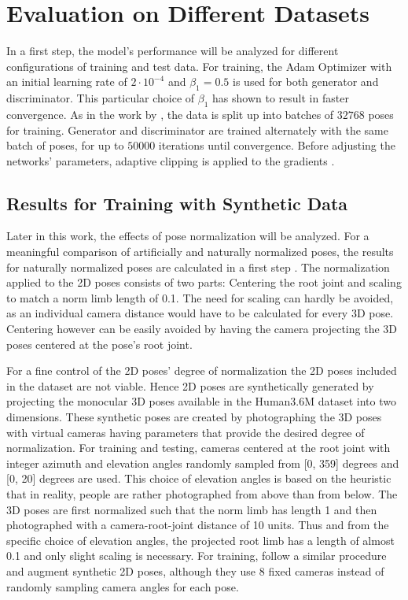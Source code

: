 \section{
	Evaluation on Different Datasets}
\label{sec:evaluation}

In a first step, the model's performance will be analyzed for different configurations of training and test data.
For training, the Adam Optimizer \cite{kingma17} with an initial learning rate of $2 \cdot 10^{-4}$ and $\beta_1 = 0.5$ is used for both generator and discriminator.
This particular choice of $\beta_1$ has shown to result in faster convergence.
As in the work by \citet{drover18}, the data is split up into batches of $32768$ poses for training.
Generator and discriminator are trained alternately with the same batch of poses, for up to $50000$ iterations until convergence.
Before adjusting the networks' parameters, adaptive clipping is applied to the gradients \cite[Section~3.2.1]{chorowski14}.


\subsection{Results for Training with Synthetic Data}

Later in this work, the effects of pose normalization will be analyzed.
For a meaningful comparison of artificially and naturally normalized poses, the results for naturally normalized poses are calculated in a first step .
The normalization applied to the 2D poses consists of two parts: Centering the root joint and scaling to match a norm limb length of 0.1.
The need for scaling can hardly be avoided, as an individual camera distance would have to be calculated for every 3D pose.
Centering however can be easily avoided by having the camera projecting the 3D poses centered at the pose's root joint.

For a fine control of the 2D poses' degree of normalization the 2D poses included in the dataset are not viable.
Hence 2D poses are synthetically generated by projecting the monocular 3D poses available in the Human3.6M dataset into two dimensions.
These synthetic poses are created by photographing the 3D poses with virtual cameras having parameters that provide the desired degree of normalization.
For training and testing, cameras centered at the root joint with integer azimuth and elevation angles randomly sampled from [0, 359] degrees and [0, 20] degrees are used.
This choice of elevation angles is based on the heuristic that in reality, people are rather photographed from above than from below.
The 3D poses are first normalized such that the norm limb has length 1 and then photographed with a camera-root-joint distance of 10 units.
Thus and from the specific choice of elevation angles, the projected root limb has a length of almost 0.1 and only slight scaling is necessary.
For training, \citet{drover18} follow a similar procedure and augment synthetic 2D poses, although they use 8 fixed cameras instead of randomly sampling camera angles for each pose.

